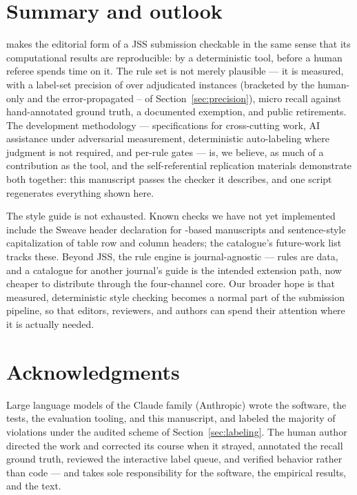 \documentclass[nojss,article]{jss}
\begin{document}
\section{Summary and outlook}
\label{sec:summary}

 makes the editorial form of a JSS submission checkable
in the same sense that its computational results are reproducible: by
a deterministic tool, before a human referee spends time on it. The
rule set is not merely plausible --- it is measured, with a label-set
precision of \StatPrecisionOverall{} over \StatPrecisionReviewed{}
adjudicated instances (bracketed by the human-only
\StatPrecisionHumanOnly{} and the error-propagated
\StatPrecisionAdjLow{}--\StatPrecisionAdjHigh{} of
Section~\ref{sec:precision}), \StatRecallMicro{} micro recall against
hand-annotated ground truth, a documented exemption, and
\StatRetiredCount{} public retirements. The development methodology
--- specifications for cross-cutting work, AI assistance under
adversarial measurement, deterministic auto-labeling where judgment
is not required, and per-rule gates --- is, we believe, as much of a
contribution as the tool, and the self-referential replication
materials demonstrate both together: this manuscript passes the
checker it describes, and one script regenerates everything shown
here.

The style guide is not exhausted. Known checks we have not yet
implemented include the Sweave header declaration for
-based manuscripts and sentence-style capitalization of
table row and column headers; the catalogue's future-work list tracks
these. Beyond JSS, the rule engine is
journal-agnostic --- rules are data, and a catalogue for another
journal's guide is the intended extension path, now cheaper to
distribute through the four-channel core. Our broader hope is that
measured, deterministic style checking becomes a normal part of the
submission pipeline, so that editors, reviewers, and authors can
spend their attention where it is actually needed.

\section*{Acknowledgments}

Large language models of the Claude family (Anthropic) wrote the
software, the tests, the evaluation tooling, and this manuscript,
and labeled the majority of violations under the audited scheme of
Section~\ref{sec:labeling}. The human author directed the work and
corrected its course when it strayed, annotated the recall ground
truth, reviewed the interactive label queue, and verified behavior
rather than code --- and takes sole responsibility for the software,
the empirical results, and the text.
\end{document}
